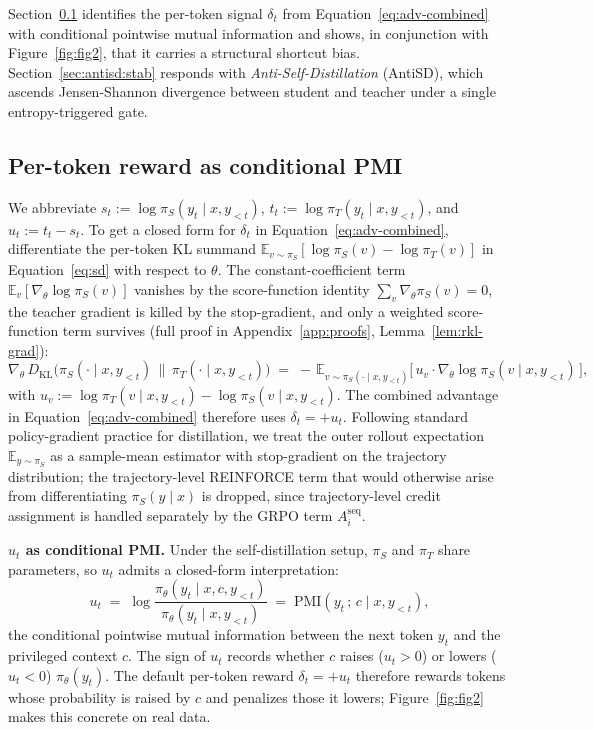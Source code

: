 \documentclass{llmxive}
\begin{document}
Section~\ref{sec:antisd:direction} identifies the per-token signal $\delta_t$ from Equation~\eqref{eq:adv-combined} with conditional pointwise mutual information and shows, in conjunction with Figure~\ref{fig:fig2}, that it carries a structural shortcut bias. Section~\ref{sec:antisd:stab} responds with \emph{Anti-Self-Distillation} (AntiSD), which ascends Jensen-Shannon divergence between student and teacher under a single entropy-triggered gate.

\subsection{Per-token reward as conditional PMI}
\label{sec:antisd:direction}
\vspace{-0.5em}

We abbreviate $s_t := \log \pi_S(y_t \mid x, y_{<t})$, $t_t := \log \pi_T(y_t \mid x, y_{<t})$, and $u_t := t_t - s_t$. To get a closed form for $\delta_t$ in Equation~\eqref{eq:adv-combined}, differentiate the per-token KL summand $\mathbb{E}_{v \sim \pi_S}[\log \pi_S(v) - \log \pi_T(v)]$ in Equation~\eqref{eq:sd} with respect to $\theta$. The constant-coefficient term $\mathbb{E}_v[\nabla_\theta \log \pi_S(v)]$ vanishes by the score-function identity $\sum_v \nabla_\theta \pi_S(v) = 0$, the teacher gradient is killed by the stop-gradient, and only a weighted score-function term survives (full proof in Appendix~\ref{app:proofs}, Lemma~\ref{lem:rkl-grad}):
\begin{equation}
  \nabla_\theta\, D_{\mathrm{KL}}\!\big( \pi_S(\cdot \mid x, y_{<t}) \,\big\|\, \pi_T(\cdot \mid x, y_{<t}) \big)
  \;=\;
  - \,\mathbb{E}_{v \sim \pi_S(\cdot \mid x, y_{<t})}\!\Big[\, u_v \cdot \nabla_\theta \log \pi_S(v \mid x, y_{<t}) \,\Big],
  \label{eq:thm1-grad}
\end{equation}
with $u_v := \log \pi_T(v \mid x, y_{<t}) - \log \pi_S(v \mid x, y_{<t})$. The combined advantage in Equation~\eqref{eq:adv-combined} therefore uses $\delta_t = +u_t$. Following standard policy-gradient practice for distillation, we treat the outer rollout expectation $\mathbb{E}_{y \sim \pi_S}$ as a sample-mean estimator with stop-gradient on the trajectory distribution; the trajectory-level REINFORCE term that would otherwise arise from differentiating $\pi_S(y \mid x)$ is dropped, since trajectory-level credit assignment is handled separately by the GRPO term $A_i^{\mathrm{seq}}$.

\textbf{$u_t$ as conditional PMI.} Under the self-distillation setup, $\pi_S$ and $\pi_T$ share parameters, so $u_t$ admits a closed-form interpretation:
\begin{equation}
  u_t \;=\; \log \frac{\pi_\theta(y_t \mid x, c, y_{<t})}{\pi_\theta(y_t \mid x, y_{<t})} \;=\; \mathrm{PMI}(y_t\,;\, c \mid x, y_{<t}),
  \label{eq:pmi}
\end{equation}
the conditional pointwise mutual information between the next token $y_t$ and the privileged context $c$. The sign of $u_t$ records whether $c$ raises ($u_t > 0$) or lowers ($u_t < 0$) $\pi_\theta(y_t)$. The default per-token reward $\delta_t = +u_t$ therefore rewards tokens whose probability is raised by $c$ and penalizes those it lowers; Figure~\ref{fig:fig2} makes this concrete on real data.
\end{document}
